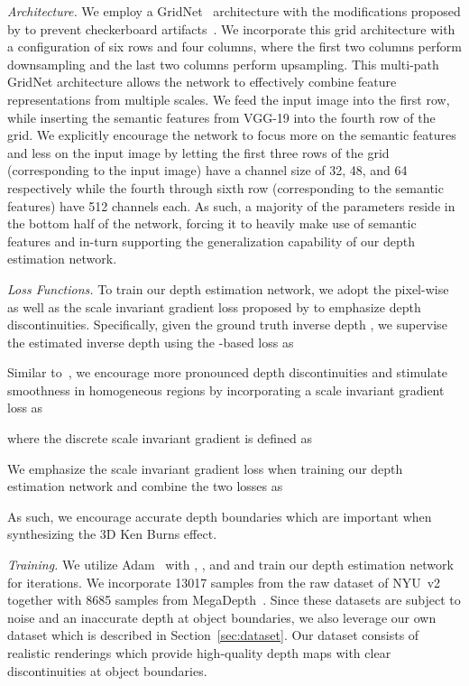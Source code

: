 \documentclass[acmtog,authorversion]{acmart}
\begin{document}
\textit{Architecture.} We employ a GridNet~\cite{Fourure_BMVC_2017} architecture with the modifications proposed by \cite{Niklaus_CVPR_2018} to prevent checkerboard artifacts~\cite{Odena_OTHER_2016}. We incorporate this grid architecture with a configuration of six rows and four columns, where the first two columns perform downsampling and the last two columns perform upsampling. This multi-path GridNet architecture allows the network to effectively combine feature representations from multiple scales. We feed the input image into the first row, while inserting the semantic features from VGG-19 into the fourth row of the grid. We explicitly encourage the network to focus more on the semantic features and less on the input image by letting the first three rows of the grid (corresponding to the input image) have a channel size of 32, 48, and 64 respectively while the fourth through sixth row (corresponding to the semantic features) have 512 channels each. As such, a majority of the parameters reside in the bottom half of the network, forcing it to heavily make use of semantic features and in-turn supporting the generalization capability of our depth estimation network. 

\textit{Loss Functions.} To train our depth estimation network, we adopt the pixel-wise  as well as the scale invariant gradient loss proposed by \cite{Ummenhofer_CVPR_2017} to emphasize depth discontinuities. Specifically, given the ground truth inverse depth , we supervise the estimated inverse depth  using the -based loss as

Similar to~\cite{Ummenhofer_CVPR_2017}, we encourage more pronounced depth discontinuities and stimulate smoothness in homogeneous regions by incorporating a scale invariant gradient loss as

where the discrete scale invariant gradient  is defined as

We emphasize the scale invariant gradient loss when training our depth estimation network and combine the two losses as

As such, we encourage accurate depth boundaries which are important when synthesizing the 3D Ken Burns effect.

\textit{Training.} We utilize Adam~\cite{Kingma_ARXIV_2014} with , , and  and train our depth estimation network for  iterations. We incorporate 13017 samples from the raw dataset of NYU~v2~\cite{Silberman_ECCV_2012} together with 8685 samples from MegaDepth~\cite{Li_CVPR_2018}. Since these datasets are subject to noise and an inaccurate depth at object boundaries, we also leverage our own dataset which is described in Section~\ref{sec:dataset}. Our dataset consists of realistic renderings which provide high-quality depth maps with clear discontinuities at object boundaries.
\end{document}
